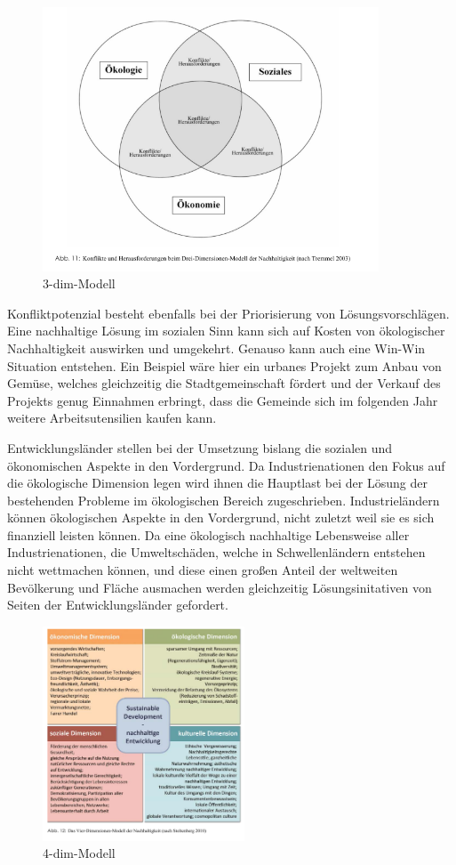 \documentclass{scrartcl}
\begin{document}
\begin{figure}[htbp]
\centering
\includegraphics[width=10cm]{image_folder/dreidimensionenmodell_der_N.png}
\caption{3-dim-Modell}
\label{fig:3-dimensionen Modell}
\end{figure}

Konfliktpotenzial besteht ebenfalls bei der Priorisierung von Lösungsvorschlägen. Eine nachhaltige Lösung im sozialen Sinn kann sich auf Kosten von ökologischer Nachhaltigkeit auswirken und umgekehrt. Genauso kann auch eine Win-Win Situation entstehen. Ein Beispiel wäre hier ein urbanes Projekt zum Anbau von Gemüse, welches gleichzeitig die Stadtgemeinschaft fördert und der Verkauf des Projekts genug Einnahmen erbringt, dass die Gemeinde sich im folgenden Jahr weitere Arbeitsutensilien kaufen kann.

Entwicklungsländer stellen bei der Umsetzung bislang die sozialen und ökonomischen Aspekte in den Vordergrund. Da Industrienationen den Fokus auf die ökologische Dimension legen wird ihnen die Hauptlast bei der Lösung der bestehenden Probleme im ökologischen Bereich zugeschrieben. Industrieländern können ökologischen Aspekte in den Vordergrund, nicht zuletzt weil sie es sich finanziell leisten können. Da eine ökologisch nachhaltige Lebensweise aller Industrienationen, die Umweltschäden, welche in Schwellenländern entstehen nicht wettmachen können, und diese einen großen Anteil der weltweiten Bevölkerung und Fläche ausmachen werden gleichzeitig Lösungsinitativen von Seiten der Entwicklungsländer gefordert.

\begin{figure}[h]
\centering
\includegraphics[width=6cm]{image_folder/vierdimensionenmodell_der_N.png}
\caption{4-dim-Modell}
\label{fig:4-dimensionen Modell}
\end{figure}
\end{document}
